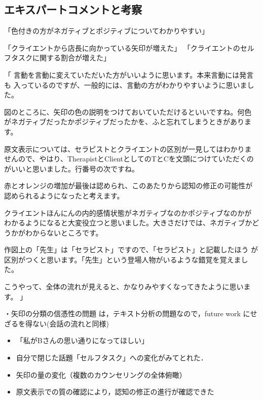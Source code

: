 \documentclass[shuuron]{kuee}
\begin{document}
%

\subsection{エキスパートコメントと考察}

「色付きの方がネガティブとポジティブについてわかりやすい」

「クライエントから店長に向かっている矢印が増えた」
「クライエントのセルフタスクに関する割合が増えた」

「
言動を言動に変えていただいた方がいいように思います。本来言動には発言も
入っているのですが、一般的には、言動の方がわかりやすいように思いました。

図のところに、矢印の色の説明をつけておいていただけるといいですね。何色
がネガティブだったかポジティブだったかを、ふと忘れてしまうときがあります。

原文表示については、セラピストとクライエントの区別が一見してはわかりま
せんので、やはり、TherapistとClientとしてのTとCを文頭につけていただくの
がいいと思いました。行番号の次ですね。

赤とオレンジの増加が最後は認められ、このあたりから認知の修正の可能性が
認められるようになったと考えます。

クライエントほんにんの内的感情状態がネガティブなのかポジティブなのかが
わかるようになると大変役立つと思いました。大きさだけでは、ネガティブかど
うかがわからないところです。

作図上の「先生」は「セラピスト」ですので、「セラピスト」と記載したほう
が区別がつくと思います。「先生」という登場人物がいるような錯覚を覚えまし
た。

こうやって、全体の流れが見えると、かなりみやすくなってきたように思いま
す。
」

・矢印の分類の信憑性の問題
は，テキスト分析の問題なので，future work にせざるを得ない(会話の流れと同様)

\begin{itemize}

  \item 「私がBさんの思い通りになってほしい」
  \item 自分で閉じた話題「セルフタスク」への変化がみてとれた．
  \item 矢印の量の変化（複数のカウンセリングの全体俯瞰）
  \item 原文表示での質の確認により，認知の修正の進行が確認できた
\end{itemize}
\end{document}
